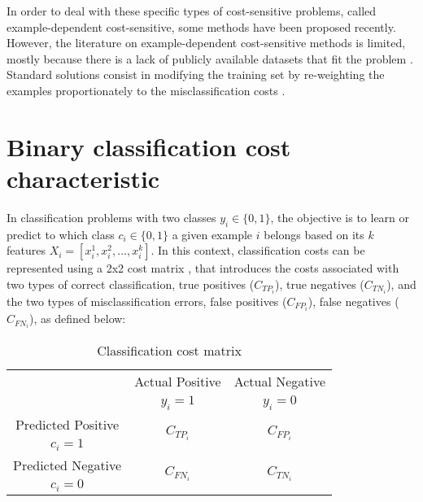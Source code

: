   In order to deal with these specific types of cost-sensitive problems, called example-dependent
  cost-sensitive, some methods have been proposed recently. However, the literature on 
	example-dependent cost-sensitive methods is limited, mostly because there is a lack of publicly 
	available datasets that fit the problem \citep{MacAodha2013}. Standard solutions consist in 
	modifying the training set by re-weighting the examples proportionately to the misclassification 
	costs \citep{Elkan2001,Zadrozny2003}.

\section{Binary classification cost characteristic}
	  In classification problems with two classes $y_i \in \{0,1\}$, the objective is to learn or 
		predict to which class $c_i \in \{0,1\}$ a given example $i$ belongs based on its $k$ features 
		$X_i=[x^1_i, x^2_i,...,x^k_i]$. In this context, classification costs can be represented using 
		a 2x2 cost matrix \citep{Elkan2001}, that introduces the costs associated with two types of 
		correct classification, true positives ($C_{TP_i}$), true negatives ($C_{TN_i}$), and the two 
		types of misclassification errors, false positives ($C_{FP_i}$), false negatives ($C_{FN_i}$),
	  as defined below:
		\begin{table}[h]
			\caption{Classification cost matrix}
			\centering
      \begin{tabular}{c|c|c}
				\multicolumn{1}{c|}{}  & Actual Positive& Actual Negative \\
				\multicolumn{1}{c|}{} & $y_i=1$& $y_i=0$ \\
				\hline
				Predicted Positive 		& \multirow{ 2}{*}{$C_{TP_i}$} & \multirow{ 2}{*}{$C_{FP_i}$} \\
				$c_i=1$ & &\\
				\hline
				Predicted Negative  	& \multirow{ 2}{*}{$C_{FN_i}$} & \multirow{ 2}{*}{$C_{TN_i}$} \\
				$c_i=0$ & &\\
			\end{tabular}
	  \end{table}  

